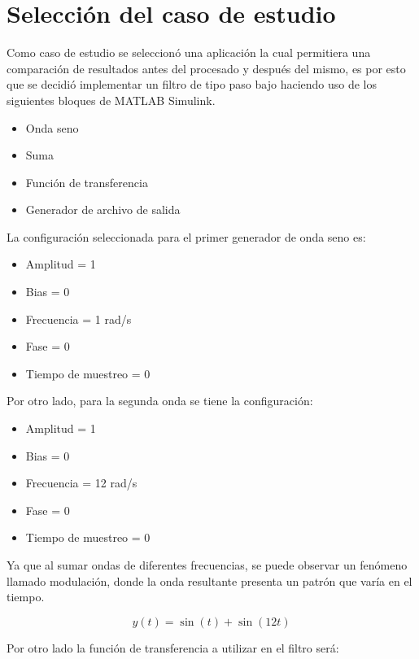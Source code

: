 \section{Selección del caso de estudio}

Como caso de estudio se seleccionó una aplicación la cual permitiera una comparación de resultados antes del procesado y después del mismo, es por esto que se decidió implementar un filtro  de tipo paso bajo haciendo uso de los siguientes bloques de MATLAB Simulink. 

\begin{itemize}
    \item Onda seno
    \item Suma
    \item Función de transferencia
    \item Generador de archivo de salida
\end{itemize}

La configuración seleccionada para el primer generador de onda seno es:

\begin{itemize}
    \item Amplitud = 1
    \item Bias = 0 
    \item Frecuencia = 1 rad/s
    \item Fase = 0 
    \item Tiempo de muestreo = 0 
\end{itemize}

Por otro lado, para la segunda onda se tiene la configuración:

\begin{itemize}
    \item Amplitud = 1
    \item Bias = 0 
    \item Frecuencia = 12 rad/s
    \item Fase = 0 
    \item Tiempo de muestreo = 0 
\end{itemize}

Ya que al sumar ondas de diferentes frecuencias, se puede observar un fenómeno llamado modulación, donde la onda resultante presenta un patrón que varía en el tiempo.

\begin{equation}
    y(t) = \sin(t) + \sin(12t)
    \label{eq:funcion_de_suma_de_ondas}
\end{equation}

Por otro lado la función de transferencia a utilizar en el filtro será:

